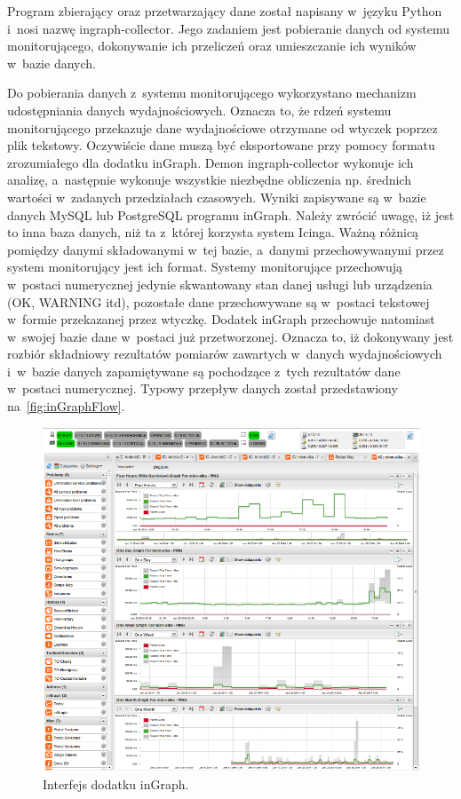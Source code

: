 Program zbierający oraz przetwarzający dane został napisany w~języku
Python i~nosi nazwę ingraph-collector. Jego zadaniem jest pobieranie
danych od systemu monitorującego, dokonywanie ich przeliczeń oraz
umieszczanie ich wyników w~bazie danych.

Do pobierania danych z~systemu monitorującego wykorzystano mechanizm
udostępniania danych wydajnościowych. Oznacza to, że rdzeń systemu
monitorującego przekazuje dane wydajnościowe otrzymane od wtyczek
poprzez plik tekstowy. Oczywiście dane muszą być eksportowane przy
pomocy formatu zrozumiałego dla dodatku inGraph. Demon
ingraph-collector wykonuje ich analizę, a~następnie wykonuje wszystkie
niezbędne obliczenia np. średnich wartości w~zadanych przedziałach
czasowych. Wyniki zapisywane są w~bazie danych MySQL lub PostgreSQL
programu inGraph. Należy zwrócić uwagę, iż jest to inna baza danych,
niż ta z~której korzysta system Icinga. Ważną różnicą pomiędzy danymi
składowanymi w~tej bazie, a~danymi przechowywanymi przez system
monitorujący jest ich format. Systemy monitorujące przechowują
w~postaci numerycznej jedynie skwantowany stan danej usługi lub
urządzenia (OK, WARNING itd), pozostałe dane przechowywane są
w~postaci tekstowej w~formie przekazanej przez wtyczkę. Dodatek
inGraph przechowuje natomiast w~swojej bazie dane w~postaci już
przetworzonej. Oznacza to, iż dokonywany jest rozbiór składniowy
rezultatów pomiarów zawartych w~danych wydajnościowych i~w~bazie
danych zapamiętywane są pochodzące z~tych rezultatów dane w~postaci
numerycznej. Typowy przepływ danych został przedstawiony
na~\ref{fig:inGraphFlow}.

\begin{figure}[ht]
  \caption{Interfejs dodatku inGraph.}
  \label{fig:inGraph}
\includegraphics[width=1\textwidth]{img/ingraph.png}
\end{figure}

